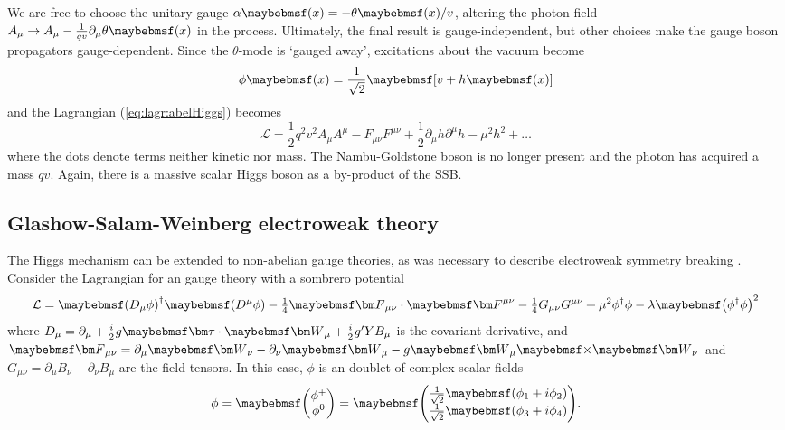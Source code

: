 We are free to choose the unitary gauge $\alpha\parenths{x} = -\theta\parenths{x}/v$,
altering the photon field $A_{\mu} \rightarrow A_{\mu} - \tfrac{1}{qv}\partial_{\mu} 
\theta\parenths{x}$ in the process. Ultimately, the final result is gauge-independent, 
but other choices make the gauge boson propagators gauge-dependent. Since the 
$\theta$-mode is `gauged away', excitations about the vacuum become
\begin{equation}
	\phi\parenths{x} = \frac{1}{\sqrt{2}} \sqbracs{v + h\parenths{x}}
\end{equation}
and the Lagrangian (\ref{eq:lagr:abelHiggs}) becomes
\begin{equation}
	\mathcal{L}
	= \frac{1}{2} q^2 v^2 A_{\mu} A^{\mu}
	- F_{\mu\nu}F^{\mu\nu}
	+ \frac{1}{2} \partial_{\mu}h \partial^{\mu}h
	- \mu^2 h^2
	+ \dots
\end{equation}
where the dots denote terms neither kinetic nor mass. 
The Nambu-Goldstone boson is no longer present and the photon has acquired a mass $qv$.
Again, there is a massive scalar Higgs boson as a by-product of the \ac{SSB}.



\subsection{Glashow-Salam-Weinberg electroweak theory}
The Higgs mechanism can be extended to non-abelian gauge theories, as was necessary to 
describe electroweak symmetry breaking \cite{Kibble:1967,Weinberg:1967,Salam:1968}.
Consider the Lagrangian for an \cross{} gauge theory with a sombrero
potential
\begin{equation}
	\mathcal{L} 
	= \parenths{D_{\mu}\phi}^{\dagger} \parenths{D^{\mu}\phi}
	- \tfrac{1}{4} \bvec{F}_{\mu\nu} \cdot \bvec{F}^{\mu\nu}
	- \tfrac{1}{4} G_{\mu\nu} G^{\mu\nu}
	+ \mu^2 \phi^{\dagger} \phi - \lambda \parenths{\phi^{\dagger} \phi}^2
	\label{eq:lagr:ewHiggs}
\end{equation}
where $D_{\mu} = \partial_{\mu} + \tfrac{i}{2} g \bvec{\tau} \cdot \bvec{W}_{\mu} + 
\tfrac{i}{2} g' Y B_{\mu}$ is the covariant derivative, and $\bvec{F}_{\mu\nu} = 
\partial_{\mu}\bvec{W}_{\nu} - \partial_{\nu}\bvec{W}_{\mu} - g \bvec{W}_{\mu} \cross 
\bvec{W}_{\nu}$ and $G_{\mu\nu} = \partial_{\mu}B_{\nu} - \partial_{\nu}B_{\mu}$ are the
field tensors. In this case, $\phi$ is an  doublet of complex scalar fields
\begin{equation}
	\phi = \colvector{\phi^+\\\phi^0} = \colvector{\frac{1}{\sqrt{2}} \parenths{\phi_1 + i\phi_2}\\ \frac{1}{\sqrt{2}} \parenths{\phi_3 + i\phi_4}}.
\end{equation}

